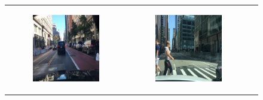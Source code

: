 %
\begin{figure}
    \centering
    \begin{tabular}{p{\horspace} p{\horspace} p{\horspace}}
    \begin{subfigure}[b]{\subfigwidth}
        \includegraphics[width=\subfigwidth]{images/gpt4/d1.jpg}
    \end{subfigure}
    \hfill &
    \begin{subfigure}[b]{\subfigwidth}
        \includegraphics[width=\subfigwidth]{images/gpt4/d2.jpg}

\end{subfigure}
\end{tabular}
\end{figure}
